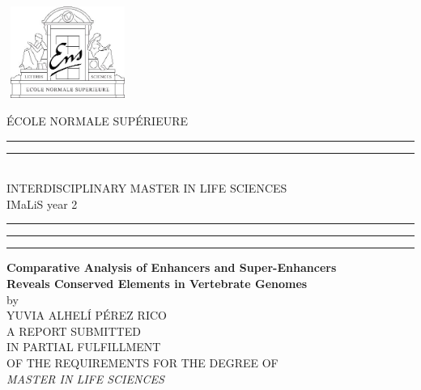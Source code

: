 \documentclass[a4paper,12pt,oneside]{article}
\author{Yuvia Alhel\'i P\'erez Rico}
\begin{document}
	\begin{titlepage}
		\begin{minipage}{0.25\textwidth}
			\begin{flushleft}
				\includegraphics[width=4cm,height=3cm]{./figures/ens1.jpg}
			\end{flushleft}
		\end{minipage}
		\begin{minipage}{0.75\textwidth}
			\begin{center}		
				\'ECOLE NORMALE SUP\'ERIEURE
				\rule{11.5cm}{0.25mm}\vspace{-4.5mm}
				\rule{11.5cm}{1.5mm}\\[1.5mm]
				INTERDISCIPLINARY MASTER IN LIFE SCIENCES\\\vspace{0.7mm}IMaLiS year 2
			\end{center}
		\end{minipage}
		\begin{minipage}{0.25\textwidth}
			\vspace{0.4cm}
			\begin{center}
				\rule{0.25mm}{0.85\textheight}\hspace{0.5mm}
				\rule{1.5mm}{0.85\textheight}\hspace{0.5mm}
				\rule{0.25mm}{0.85\textheight}
			\end{center}
		\end{minipage}	
		\begin{minipage}{0.85\textwidth}
			\begin{center}
				\vspace{3.5cm}
				\textbf{Comparative Analysis of Enhancers and Super-Enhancers\\Reveals Conserved Elements in Vertebrate Genomes}\\[1cm]
				by\\[0.5cm]YUVIA ALHEL\'I P\'EREZ RICO\\[3.5cm]
				A REPORT SUBMITTED\\\vspace{0.7mm}IN PARTIAL FULFILLMENT\\\vspace{0.7mm}OF THE REQUIREMENTS FOR THE DEGREE OF\\\vspace{0.7mm}\emph{MASTER IN LIFE SCIENCES}\\[3cm]

\end{center}
\end{minipage}
\end{titlepage}
\end{document}
